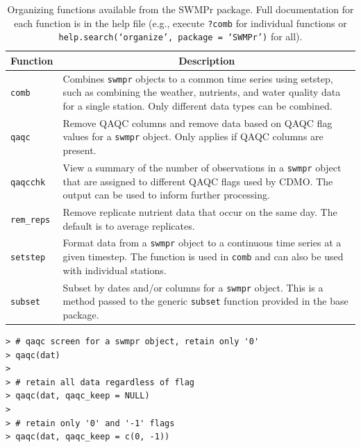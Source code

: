 \documentclass[10pt,letterpaper]{article}\usepackage[]{graphicx}\usepackage[]{color}
\makeatletter
\newenvironment{kframe}{%
 \def\at@end@of@kframe{}%
 \ifinner\ifhmode%
  \def\at@end@of@kframe{\end{minipage}}%
  \begin{minipage}{\columnwidth}%
 \fi\fi%
 \def\FrameCommand##1{\hskip\@totalleftmargin \hskip-\fboxsep
 \colorbox{shadecolor}{##1}\hskip-\fboxsep
     \hskip-\linewidth \hskip-\@totalleftmargin \hskip\columnwidth}%
 \MakeFramed {\advance\hsize-\width
   \@totalleftmargin\z@ \linewidth\hsize
   \@setminipage}}%
 {\par\unskip\endMakeFramed%
 \at@end@of@kframe}
\newenvironment{knitrout}{}{} %
\makeatother
\begin{document}
\begin{table}[!tbp]
\caption{Organizing functions available from the SWMPr package. Full documentation for each function is in the help file (e.g., execute \texttt{?comb} for individual functions or \texttt{help.search(`organize', package = `SWMPr')} for all).\label{tab:organize}} 
\begin{center}
\begin{tabular}{lp{3.5in}}
\hline\hline
\multicolumn{1}{l}{Function}&\multicolumn{1}{c}{Description}\tabularnewline
\hline
\texttt{comb}&Combines \texttt{swmpr} objects to a common time series using setstep, such as combining the weather, nutrients, and water quality data for a single station. Only different data types can be combined.\tabularnewline
\texttt{qaqc}&Remove \gls{QAQC} columns and remove data based on \gls{QAQC} flag values for a \texttt{swmpr} object.  Only applies if \gls{QAQC} columns are present. \tabularnewline
\texttt{qaqcchk}&View a summary of the number of observations in a \texttt{swmpr} object that are assigned to different \gls{QAQC} flags used by \gls{CDMO}.  The output can be used to inform further processing.\tabularnewline
\texttt{rem\_reps}&Remove replicate nutrient data that occur on the same day.  The default is to average replicates.\tabularnewline
\texttt{setstep}&Format data from a \texttt{swmpr} object to a continuous time series at a given timestep.  The function is used in \texttt{comb} and can also be used with individual stations.\tabularnewline
\texttt{subset}&Subset by dates and/or columns for a \texttt{swmpr} object.  This is a method passed to the generic \texttt{subset} function provided in the base package.\tabularnewline
\hline
\end{tabular}\end{center}

\end{table}


\begin{knitrout}\small
{}\color{fgcolor}\begin{kframe}
\begin{verbatim}
> # qaqc screen for a swmpr object, retain only '0'
> qaqc(dat)
> 
> # retain all data regardless of flag
> qaqc(dat, qaqc_keep = NULL)
> 
> # retain only '0' and '-1' flags
> qaqc(dat, qaqc_keep = c(0, -1))
\end{verbatim}
\end{kframe}
\end{knitrout}
\end{document}
